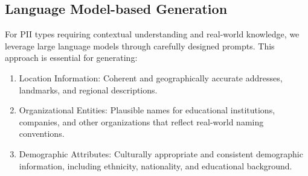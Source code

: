 \begin{table}[htp]
\centering
{}
\caption{Detailed statistics of PII types across datasets. For each dataset, we report both the absolute count (\#) and relative percentage (\%) of each PII type.}
\label{tab:pii_stats}
\end{table}

\subsection{Language Model-based Generation}
For PII types requiring contextual understanding and real-world knowledge, we leverage large language models through carefully designed prompts. This approach is essential for generating:

\begin{enumerate}
    \item Location Information: Coherent and geographically accurate addresses, landmarks, and regional descriptions.
    \item Organizational Entities: Plausible names for educational institutions, companies, and other organizations that reflect real-world naming conventions.
    \item Demographic Attributes: Culturally appropriate and consistent demographic information, including ethnicity, nationality, and educational background.
\end{enumerate}

